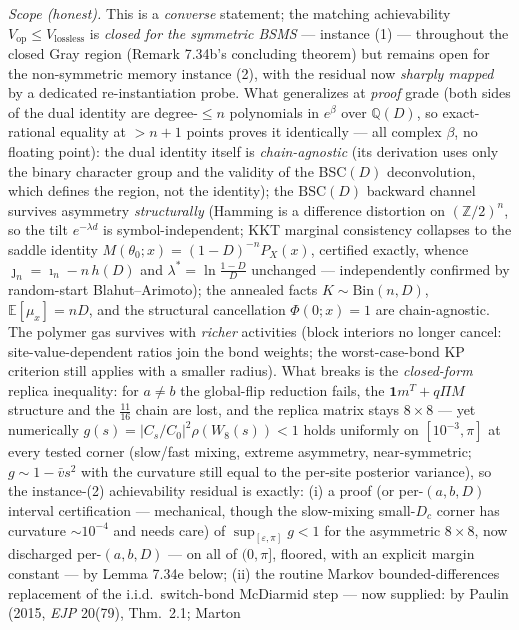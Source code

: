 \documentclass[
]{article}
\begin{document}
\emph{Scope (honest).} This is a \emph{converse} statement; the matching achievability
$V_{\mathrm{op}}\le V_{\mathrm{lossless}}$ is \emph{closed for the symmetric BSMS} --- instance (1) ---
throughout the closed Gray
region (Remark 7.34b's concluding theorem) but remains open for the non-symmetric memory instance
(2), with the residual now \emph{sharply mapped} by a dedicated re-instantiation probe. What
generalizes at \emph{proof} grade (both sides of the dual identity are degree-$\le n$ polynomials in
$e^\beta$ over $\mathbb Q(D)$, so exact-rational equality at $>n+1$ points proves it identically ---
all complex $\beta$, no floating point): the dual identity itself is \emph{chain-agnostic} (its
derivation uses only the binary character group and the validity of the BSC$(D)$ deconvolution, which
defines the region, not the identity); the $\mathrm{BSC}(D)$ backward channel survives asymmetry
\emph{structurally} (Hamming is a difference distortion on $(\mathbb Z/2)^n$, so the tilt
$e^{-\lambda d}$ is symbol-independent; KKT marginal consistency collapses to the saddle identity
$M(\theta_0;x)=(1-D)^{-n}P_X(x)$, certified exactly, whence $\jmath_n=\imath_n-n\,h(D)$ and
$\lambda^*=\ln\tfrac{1-D}{D}$ unchanged --- independently confirmed by random-start Blahut--Arimoto);
the annealed facts $K\sim\mathrm{Bin}(n,D)$, $\mathbb E[\mu_x]=nD$, and the structural cancellation
$\Phi(0;x)=1$ are chain-agnostic. The polymer gas survives with \emph{richer} activities (block
interiors no longer cancel: site-value-dependent ratios join the bond weights; the worst-case-bond KP
criterion still applies with a smaller radius). What breaks is the \emph{closed-form} replica
inequality: for $a\ne b$ the global-flip reduction fails, the $\mathbf 1m^T+q\Pi M$ structure and the
$\tfrac{11}{16}$ chain are lost, and the replica matrix stays $8\times8$ --- yet numerically
$g(s)=|C_s/C_0|^2\rho(W_8(s))<1$ holds uniformly on $[10^{-3},\pi]$ at every tested corner (slow/fast
mixing, extreme asymmetry, near-symmetric; $g\sim1-\bar vs^2$ with the curvature still equal to the
per-site posterior variance), so the instance-(2) achievability residual is exactly: (i) a proof (or
per-$(a,b,D)$ interval certification --- mechanical, though the slow-mixing small-$D_c$ corner has
curvature $\sim10^{-4}$ and needs care) of $\sup_{[\varepsilon,\pi]}g<1$ for the asymmetric
$8\times8$, now discharged per-$(a,b,D)$ --- on all of $(0,\pi]$, floored, with an explicit margin
constant --- by Lemma 7.34e below; (ii) the routine Markov bounded-differences replacement of the i.i.d.\
switch-bond McDiarmid step --- now supplied: by Paulin (2015, \emph{EJP} 20(79), Thm.~2.1; Marton
\end{document}
